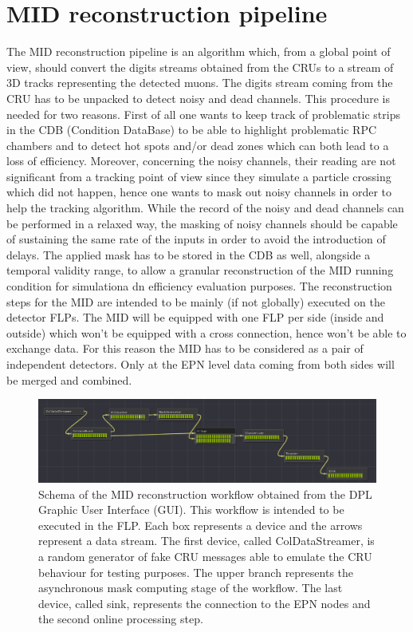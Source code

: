 \section{MID reconstruction pipeline}
The MID reconstruction pipeline is an algorithm which, from a global point of view, should convert the digits streams obtained from the CRUs to a stream of 3D tracks representing the detected muons.
The digits stream coming from the CRU has to be unpacked to detect noisy and dead channels. 
This procedure is needed for two reasons. 
First of all one wants to keep track of problematic strips in the CDB (Condition DataBase) to be able to highlight problematic RPC chambers and to detect hot spots and/or dead zones which can both lead to a loss of efficiency. 
Moreover, concerning the noisy channels, their reading are not significant from a tracking point of view since they simulate a particle crossing which did not happen, hence one wants to mask out noisy channels in order to help the tracking algorithm. 
While the record of the noisy and dead channels can be performed in a relaxed way, the masking of noisy channels should be capable of sustaining the same rate of the inputs in order to avoid the introduction of delays. 
The applied mask has to be stored in the CDB as well, alongside a temporal validity range, to allow a granular reconstruction of the MID running condition for simulationa dn efficiency evaluation purposes.
The reconstruction steps for the MID are intended to be mainly (if not globally) executed on the detector FLPs.
The MID will be equipped with one FLP per side (inside and outside) which won't be equipped with a cross connection, hence won't be able to exchange data.
For this reason the MID has to be considered as a pair of independent detectors.
Only at the EPN level data coming from both sides will be merged and combined.

\begin{figure}[!t]
\begin{center}
\includegraphics[width=1\linewidth]{Chapters/O2/Figs/MID_workflow.pdf}
\caption{Schema of the MID reconstruction workflow obtained from the DPL Graphic User Interface (GUI). This workflow is intended to be executed in the FLP. Each box represents a device and the arrows represent a data stream. The first device, called ColDataStreamer, is a random generator of fake CRU messages able to emulate the CRU behaviour for testing purposes. The upper branch represents the asynchronous mask computing stage of the workflow. The last device, called sink, represents the connection to the EPN nodes and the second online processing step.}
\label{fig:MID_workflow}
\end{center}
\end{figure}

